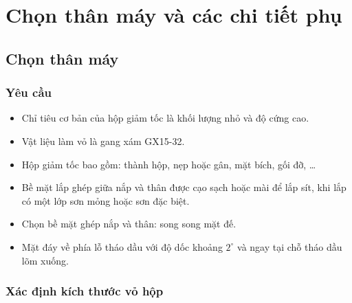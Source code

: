 \chapter{Chọn thân máy và các chi tiết phụ}
\section{Chọn thân máy}
\subsection{Yêu cầu}
\begin{itemize}
    \item Chỉ tiêu cơ bản của hộp giảm tốc là khối lượng nhỏ và độ cứng cao.
    \item Vật liệu làm vỏ là gang xám GX15-32.
    \item Hộp giảm tốc bao gồm: thành hộp, nẹp hoặc gân, mặt bích, gối đỡ, \ldots
    \item Bề mặt lắp ghép giữa nắp và thân được cạo sạch hoặc mài để lắp sít, khi lắp có một lớp sơn mỏng hoặc sơn đặc biệt.
    \item Chọn bề mặt ghép nắp và thân: song song mặt đế.
    \item Mặt đáy về phía lỗ tháo dầu với độ dốc khoảng $2^\circ$ và ngay tại chỗ tháo dầu lõm xuống.
\end{itemize}
\subsection{Xác định kích thước vỏ hộp}

